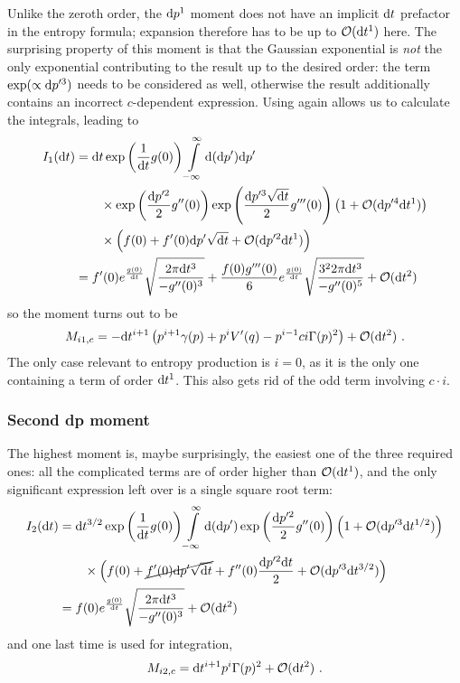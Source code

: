 Unlike the zeroth order, the \(\mathrm{d} p^1\) moment does not have an implicit \(\mathrm{d} t\) prefactor in the entropy formula; expansion therefore has to be up to \(\mathcal{O}(\mathrm{d} t^1)\) here. The surprising property of this moment is that the Gaussian exponential is \emph{not} the only exponential contributing to the result up to the desired order: the term \(\operatorname{exp}(\propto\mathrm{d} p'^3)\) needs to be considered as well, otherwise the result additionally contains an incorrect \(c\)-dependent expression. Using  again allows us to calculate the integrals, leading to
%
\begin{align*}
	I_1(\mathrm{d} t)
	&=
	\mathrm{d} t\operatorname{exp}\left(\frac1{\mathrm{d} t}g(0)\right)
	\int\limits_{-\infty}^\infty\mathrm{d}(\mathrm{d} p')\mathrm{d} p'
	\\&\qquad\times
		\operatorname{exp}\left(\frac{\mathrm{d} p'^2}2g''(0)\right)
		\operatorname{exp}\left(\frac{\mathrm{d} p'^3\sqrt{\mathrm{d} t}}2g'''(0)\right)
		\left(1+\mathcal{O}(\mathrm{d} p'^4\mathrm{d} t^1)\right)
	\\&\qquad
	\times\Bigl(
	  f(0)
	+ f'(0)\mathrm{d} p'\sqrt{\mathrm{d} t}
	+ \mathcal{O}(\mathrm{d} p'^2\mathrm{d} t^1)
	\Bigr)
	\\
	&= f'(0)e^{\frac{g(0)}{\mathrm{d} t}}\sqrt{\frac{2\pi\mathrm{d} t^3}{-g''(0)^3}}
	   + \frac{f(0)g'''(0)}6e^{\frac{g(0)}{\mathrm{d} t}}\sqrt{\frac{3^22\pi\mathrm{d} t^3}{-g''(0)^5}}
	   + \mathcal{O}(\mathrm{d} t^2)
\end{align*}
%
so the moment turns out to be
%
\begin{align}
	M_{i1,c} = -\mathrm{d} t^{i+1}\left(
		p^{i+1}\gamma(p)
		+ p^iV'(q)
		- p^{i-1}ci\Gamma(p)^2\right)
	+ \mathcal{O}(\mathrm{d} t^2) ~.
\end{align}
%
The only case relevant to entropy production is \(i = 0\), as it is the only one containing a term of order \(\mathrm{d} t^1\). This also gets rid of the odd term involving \(c\cdot i\).

\subsubsection{Second dp moment}

The highest moment is, maybe surprisingly, the easiest one of the three required ones: all the complicated terms are of order higher than \(\mathcal{O}(\mathrm{d} t^1)\), and the only significant expression left over is a single square root term:
%
\begin{align*}
	I_2(\mathrm{d} t)
	&=
	\mathrm{d} t^{3/2}\operatorname{exp}\left(\frac1{\mathrm{d} t}g(0)\right)
	\int\limits_{-\infty}^\infty\mathrm{d}(\mathrm{d} p')\operatorname{exp}\left(\frac{\mathrm{d} p'^2}2g''(0)\right)
	\left(1+\mathcal{O}(\mathrm{d} p'^3\mathrm{d} t^{1/2})\right)
	\\&\qquad
	\times\Bigl(
	  f(0)
	+ \cancel{f'(0)\mathrm{d} p'\sqrt{\mathrm{d} t}}
	+ f''(0)\frac{\mathrm{d} p'^2\mathrm{d} t}2
	+ \mathcal{O}(\mathrm{d} p'^3\mathrm{d} t^{3/2})
	\Bigr)
	\\
	&=   f(0)e^{\frac{g(0)}{\mathrm{d} t}}\sqrt{\frac{2\pi\mathrm{d} t^3}{-g''(0)^3}}
	   + \mathcal{O}(\mathrm{d} t^2)
\end{align*}
%
and one last time  is used for integration,
%
\begin{align}
	M_{i2,c} = \mathrm{d} t^{i+1} p^i \Gamma(p)^2 + \mathcal{O}(\mathrm{d} t^2) ~.
\end{align}

